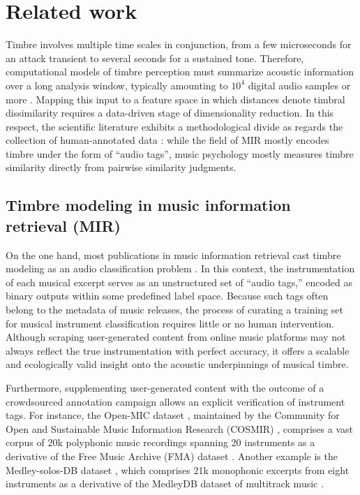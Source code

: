 \documentclass{bmcart}
\newcommand{\ja}[1]{\textcolor{purple}{JA: #1}\xspace}
\newcommand{\nmu}{}
\begin{document}
\section*{\nmu Related work}
\label{sec:related-work}

Timbre involves multiple time scales in conjunction, from a few microseconds for an attack transient to several seconds for a sustained tone.
Therefore, computational models of timbre perception must summarize acoustic information over a long analysis window, typically amounting to $10^{4}$ digital audio samples or more \cite{joder2009taslp}.
Mapping this input to a feature space in which distances denote timbral dissimilarity requires a data-driven stage of dimensionality reduction.
In this respect, the scientific literature exhibits a methodological divide as regards the collection of human-annotated data \cite{siedenburg2016jnmr}: while the field of MIR mostly encodes timbre under the form of ``audio tags'', music psychology mostly measures timbre similarity directly from pairwise similarity judgments.

\subsection*{Timbre modeling in music information retrieval (MIR)}
On the one hand, most publications in music information retrieval cast timbre modeling as an audio classification problem  \cite{martin1998asa,brown1999jasa,eronen2000icassp,herrera2003jnmr,wieczorkowska2003jiis,livshin2004dafx,krishna2004icassp,kaminskyj2005jiis,benetos2006icassp,bhalke2016jiis}.
In this context, the instrumentation of each musical excerpt serves as an unstructured set of ``audio tags,'' encoded as binary outputs within some predefined label space.
Because such tags often belong to the metadata of music releases, the process of curating a training set for musical instrument classification requires little or no human intervention.
Although scraping user-generated content from online music platforms may not always reflect the true instrumentation with perfect accuracy, it offers a scalable and ecologically valid insight onto the acoustic underpinnings of musical timbre.

Furthermore, supplementing user-generated content with the outcome of a crowdsourced annotation campaign allows an explicit verification of instrument tags.
For instance, the Open-MIC dataset \cite{humphrey2018ismir}, maintained by the Community for Open and Sustainable Music Information Research (COSMIR) \cite{mcfee2016ismir}, comprises a vast corpus of 20k polyphonic music recordings spanning 20 instruments as a derivative of the Free Music Archive (FMA) dataset \cite{defferrard2017ismir}. %
Another example is the Medley-solos-DB dataset \cite{lostanlen2016ismir}, which comprises 21k monophonic excerpts from eight instruments as a derivative of the MedleyDB dataset of multitrack music \cite{bittner2014ismir}.
\end{document}
